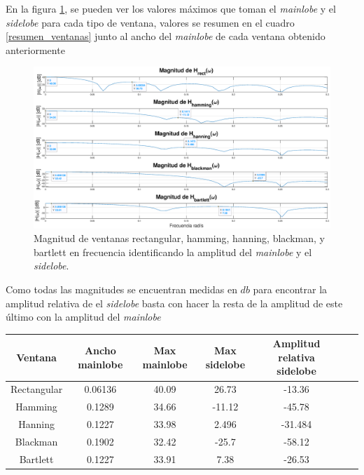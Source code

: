 \begin{enumerate}
En la figura \ref{lobulos}, se pueden ver los valores máximos que toman el \textit{mainlobe} y el \textit{sidelobe} para cada tipo de ventana, valores se resumen en el cuadro \ref{resumen_ventanas} junto al ancho del \textit{mainlobe}  de cada ventana obtenido anteriormente


\begin{figure}[H]
    \centering
    \includegraphics[scale = 0.3]{Figuras/p2_2-Lobulos.eps}
    \caption{Magnitud de ventanas rectangular, hamming, hanning, blackman, y bartlett en frecuencia identificando la amplitud del \textit{mainlobe} y el \textit{sidelobe}.}
    \label{lobulos}
\end{figure}


 Como todas las magnitudes se encuentran medidas en $db$ para encontrar la amplitud relativa de el \textit{sidelobe} basta con hacer la resta de la amplitud de este último con la amplitud del \textit{mainlobe}
 
 \begin{table}[H]
        \centering
        \begin{tabular}{|c|c|c|c|c|c|c|}
        \hline
         Ventana   & Ancho mainlobe & Max mainlobe & Max sidelobe & Amplitud relativa sidelobe\\
         \hline
         Rectangular  & 0.06136	 &  40.09 &	26.73	& -13.36 \\
         \hline
         Hamming  & 0.1289 &	34.66	& -11.12 &	-45.78	 \\
         \hline
         Hanning & 0.1227	& 33.98 &	2.496 &	 -31.484  \\
         \hline
        
         Blackman  & 0.1902 &	32.42	& -25.7 &	-58.12\\
         \hline
        
        Bartlett  & 0.1227 &	33.91	& 7.38 &	-26.53	\\
         \hline


\end{tabular}
\end{table}
\end{enumerate}
